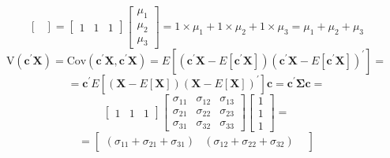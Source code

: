 \begin{enumerate}[font=\bfseries]
\begin{enumerate}
\[\begin{bmatrix}
                \end{bmatrix}
                =
                \begin{bmatrix}
                    1 & 1 & 1
                \end{bmatrix}                
                \begin{bmatrix}
                    \mu_1 \\
                    \mu_2 \\
                    \mu_3
                \end{bmatrix}
                =
                1 \times \mu_1 + 1 \times \mu_2 + 1 \times \mu_3
                =
                \mu_1 + \mu_2 + \mu_3
            \]
            \[
                \text{V}\left(\textbf{c}^\prime\textbf{X}\right)
                =
                \text{Cov}\left(\textbf{c}^\prime\textbf{X},\textbf{c}^\prime\textbf{X}\right)
                =
                E\left[\left(\textbf{c}^\prime\textbf{X} - E\left[\textbf{c}^\prime\textbf{X}\right]\right)\left(\textbf{c}^\prime\textbf{X} - E\left[\textbf{c}^\prime\textbf{X}\right]\right)^\prime\right]
                =
            \]
            \[
                =
                \textbf{c}^\prime E\left[\left(\textbf{X} - E\left[\textbf{X}\right]\right){\left(\textbf{X} - E\left[\textbf{X}\right]\right)}^\prime\right]\textbf{c}
                =
                \textbf{c}^\prime\mathbf{\Sigma}\textbf{c}
                =
            \]
            \[
                \begin{bmatrix}
                    1 & 1 & 1
                \end{bmatrix}
                \begin{bmatrix}
                    \sigma_{11} & \sigma_{12} & \sigma_{13} \\
                    \sigma_{21} & \sigma_{22} & \sigma_{23} \\
                    \sigma_{31} & \sigma_{32} & \sigma_{33}
                \end{bmatrix}
                \begin{bmatrix}
                    1 \\
                    1 \\
                    1
                \end{bmatrix}
                =
            \]
            \[
                =
                \begin{bmatrix}
                    \left(\sigma_{11} + \sigma_{21} + \sigma_{31}\right) &
                    \left(\sigma_{12} + \sigma_{22} + \sigma_{32}\right) &

\end{bmatrix}\]
\end{enumerate}
\end{enumerate}
